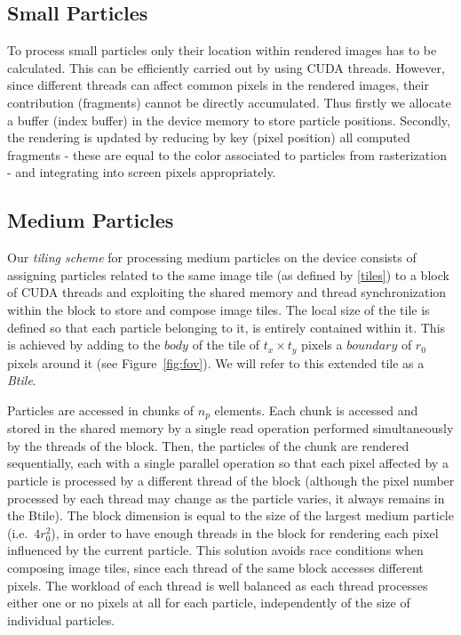 \documentclass[1p]{elsarticle}
\begin{document}
\subsection{Small Particles}
\label{sec:smallparticles}
To process small particles only their location within rendered images has to be calculated. This can be efficiently carried out by using CUDA threads. However, since different threads can affect common pixels in the rendered images, their contribution (fragments) cannot be directly accumulated. Thus firstly we allocate a buffer (index buffer) in the device memory to store particle positions. Secondly, the rendering is updated by reducing by key (pixel position) all computed fragments - these are equal to the color associated to particles from rasterization - and integrating into screen pixels appropriately.

\subsection{Medium Particles}
\label{sec:mediumparticles}
Our \textit{tiling scheme} for processing medium particles on the device consists of assigning particles related to the same image tile (as defined by \eqref{tiles}) to a block of CUDA threads and exploiting the shared memory and thread synchronization within the block to store and compose image tiles. The local size of the tile is defined so that each particle belonging to it, is entirely contained within it. This is achieved by adding to the $body$ of the tile of $t_x \times t_y$ pixels a $boundary$ of $r_0$ pixels around it (see Figure~\ref{fig:fov}). We will refer to this extended tile as a \textit{Btile}.

Particles are accessed in chunks of $n_p$ elements. Each chunk is accessed and stored in the shared memory by a single read operation performed simultaneously by the threads of the block. Then, the particles of the chunk are rendered sequentially, each with a single parallel operation so that each pixel affected by a particle is processed by a different thread of the block (although the pixel number processed by each thread may change as the particle varies, it always remains in the Btile). The block dimension is equal to the size of the largest medium particle (i.e.~$4r_0^2$), in order to have enough threads in the block for rendering each pixel influenced by the current particle. 
This solution avoids race conditions when composing image tiles, since each
thread of the same block accesses different pixels. The workload of each
thread is well balanced as each thread processes either one or no pixels at all for each particle, independently of the size of individual particles.
\end{document}
